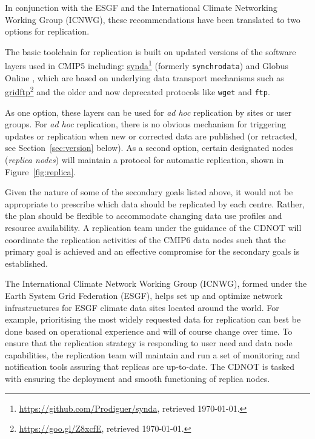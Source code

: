 \documentclass[gmd,manuscript]{copernicus}
\newcommand{\urlref}[2] {\href{#1}{#2}\footnote{\url{#1}, retrieved \today.}}
\begin{document}
In conjunction with the ESGF and the International Climate Networking
Working Group (ICNWG), these recommendations have been translated to
two options for replication.

The basic toolchain for replication is built on updated versions of
the software layers used in CMIP5 including:
\urlref{https://github.com/Prodiguer/synda}{synda} (formerly
\texttt{synchrodata}) and Globus Online \citep{ref:chardetal2015}, which
are based on underlying data transport mechanisms such as
\urlref{https://goo.gl/Z8xcfE}{gridftp} and the older and now deprecated
protocols like \texttt{wget} and \texttt{ftp}.

As one option, these layers can be used for \emph{ad hoc} replication by
sites or user groups. For \emph{ad hoc} replication, there is no
obvious mechanism for triggering updates or replication when new or
corrected data are published (or retracted, see Section~\ref{sec:version} below).
As a second option, certain designated nodes (\emph{replica nodes}) will maintain a protocol
for automatic replication, shown in Figure~\ref{fig:replica}.

\begin{figure*}
  \begin{center}
  \end{center}
  \caption{CMIP6 replication from data nodes to replica centres and
    between replica centres coordinated by a CMIP6 replication team,
    under the guidance of the CDNOT.}
  \label{fig:replica}
\end{figure*}

Given the nature of some of the secondary goals listed above, it would
not be appropriate to prescribe which data should be replicated by
each centre. Rather, the plan should be flexible to accommodate
changing data use profiles and resource availability.
A replication team under the guidance of the CDNOT will coordinate the
replication activities of the CMIP6 data nodes such that the primary
goal is achieved and an effective compromise for the secondary goals
is established.

The International Climate Network Working Group (ICNWG), formed under
the Earth System Grid Federation (ESGF), helps set up and optimize
network infrastructures for ESGF climate data sites located around the
world. For example, prioritising the most widely requested data for
replication can best be done based on operational experience and will
of course change over time. To ensure that the replication strategy is
responding to user need and data node capabilities, the replication
team will maintain and run a set of monitoring and notification tools
assuring that replicas are up-to-date. The CDNOT is tasked with
ensuring the deployment and smooth functioning of replica nodes.
\end{document}
